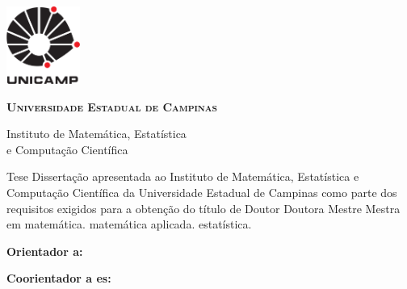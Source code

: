 \thispagestyle{plain}
\includegraphics[width=.94in, height=1in,keepaspectratio=true]{figuras/unicamp-logo}
\begin{center}
  {\large\textbf{\textsc{Universidade Estadual de Campinas}}
  \vspace{.3cm}

  Instituto de Matemática, Estatística \\
  e Computação Científica}
\end{center}
\vfill
\begin{center}
  {\large\textbf{\textsc{\autor}}}
\end{center}
\vfill
\begin{center}
  {\Large\textbf{\textsc{\titulo}}}
\end{center}
\vfill

\begin{flushright}
  \begin{minipage}[c]{.5\textwidth}
    \ifx\mestrado\undefined
    Tese
    \else
    Dissertação
    \fi
    apresentada ao Instituto de Matemática,
    Estatística e Computação Científica da Universidade
    Estadual de Campinas como parte dos requisitos exigidos
    para a obtenção do título de
    \ifx\mestrado\undefined
    \ifx\femaleAuthor\undefined
    Doutor
    \else
    Doutora
    \fi
    \else
    \ifx\femaleAuthor\undefined
    Mestre
    \else
    Mestra
    \fi
    \fi
    em
    \ifx\matematica\undefined
    \else
    matemática.
    \fi
    \ifx\aplicada\undefined
    \else
    matemática aplicada.
    \fi
    \ifx\estatistica\undefined
    \else
    estatística.
    \fi
  \end{minipage}
\end{flushright}
\vspace{.3cm}

\noindent
\textbf{Orientador\ifx\femaleOrientador\undefined
\else
a\fi: \orientador
}
\vspace{.15cm}

\ifx\coorientador\undefined
\else
\noindent
\textbf{Coorientador\ifx\femaleCoorientador\undefined
\else
a\fi\ifx\Coorientadores\undefined
\else
es\fi: \coorientador
}
\fi

